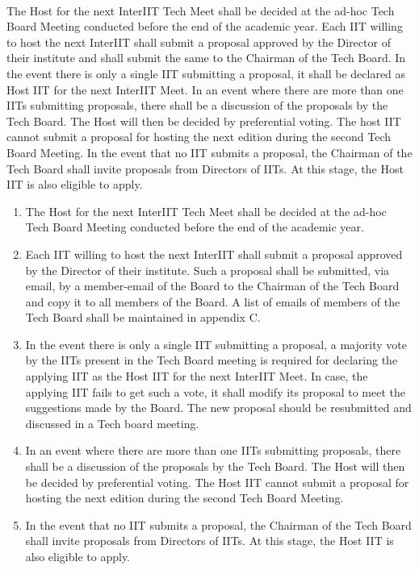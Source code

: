 \paragraph{}
The Host for the next InterIIT Tech Meet shall be decided at the ad-hoc Tech Board Meeting conducted before the end of the academic year. Each IIT willing to host the next InterIIT shall submit a proposal approved by the Director of their institute and shall submit the same to the Chairman of the Tech Board. In the event there is only a single IIT submitting a proposal, it shall be declared as Host IIT for the next InterIIT Meet. In an event where there are more than one IITs submitting proposals, there shall be a discussion of the proposals by the Tech Board. The Host will then be decided by preferential voting. The host IIT cannot submit a proposal for hosting the next edition during the second Tech Board Meeting. In the event that no IIT submits a proposal, the Chairman of the Tech Board shall invite proposals from Directors of IITs. At this stage, the Host IIT is also eligible to apply.

\begin{enumerate}
    \item The Host for the next InterIIT Tech Meet shall be decided at the ad-hoc Tech Board Meeting conducted before the end of the academic year.
    \item Each IIT willing to host the next InterIIT shall submit a proposal approved by the Director of their institute. Such a proposal shall be submitted, via email, by a member-email of the Board to the Chairman of the Tech Board and copy it to all members of the Board. A list of emails of members of the Tech Board shall be maintained in appendix C. 
    \item In the event there is only a single IIT submitting a proposal, a majority vote by the IITs present in the Tech Board meeting is required for declaring the applying IIT as the Host IIT for the next InterIIT Meet. In case, the applying IIT fails to get such a vote, it shall modify its proposal to meet the suggestions made by the Board. The new proposal should be resubmitted and discussed in a Tech board meeting.
    \item In an event where there are more than one IITs submitting proposals, there shall be a discussion of the proposals by the Tech Board. The Host will then be decided by preferential voting. The Host IIT cannot submit a proposal for hosting the next edition during the second Tech Board Meeting. 
    \item In the event that no IIT submits a proposal, the Chairman of the Tech Board shall invite proposals from Directors of IITs. At this stage, the Host IIT is also eligible to apply.

\end{enumerate}

